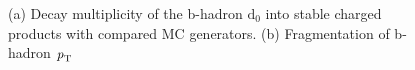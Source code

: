 \begin{figure}[H]
    \centering
    \qquad
    \caption{ (a) Decay multiplicity of the b-hadron $\textrm{d}_{\textrm{0}}$ into stable charged products with compared MC generators.
    (b) Fragmentation of b-hadron $\textrm{\textit{p}}_{\textrm{T}}$ }
\label{fig:bjet-plots}
\end{figure}

